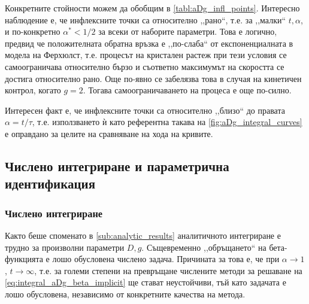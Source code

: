 Конкретните стойности можем да обобщим в \autoref{tabl:aDg_infl_points}. Интересно наблюдение е, че инфлексните точки са относително ,,рано``, т.е. за ,,малки`` $t, \alpha$, и по-конкретно $\alpha^* < 1/2$ за всеки от наборите параметри. Това е логично, предвид че положителната обратна връзка е ,,по-слаба`` от експоненциалната в модела на Ферхюлст, т.е. процесът на кристален растеж при тези условия се самоограничава относително бързо и  съответно максимумът на скоростта се достига относително рано. Още по-явно се забелязва това в случая на кинетичен контрол, когато $g = 2$. Тогава самоограничаването на процеса е още по-силно.

Интересен факт е, че инфлексните точки са относително ,,близо`` до правата $\alpha = t/\tau$, т.е. използването ѝ като референтна такава на \autoref{fig:aDg_integral_curves} е оправдано за целите на сравняване на хода на кривите.
\begin{table}[htbp]
	\centering
	\caption{Инфлексни точки на $\aDg$ моделите при различни стойности на параметрите $D, g$}
	\label{tabl:aDg_infl_points}
\end{table}
\subsection{Числено интегриране и параметрична идентификация}
\subsubsection{Числено интегриране}
\label{subsub:numeric_integration}
Както беше споменато в \autoref{sub:analytic_results} аналитичното интегриране е трудно за произволни параметри $D, g$. Същевременно ,,обръщането`` на бета-функцията е лошо обусловена числено задача. Причината за това е, че при $\alpha \rightarrow 1$, $t \rightarrow \infty$, т.е. за големи степени на превръщане числените методи за решаване на \autoref{eq:integral_aDg_beta_implicit} ще стават неустойчиви, тъй като задачата е лошо обусловена, независимо от конкретните качества на метода.

